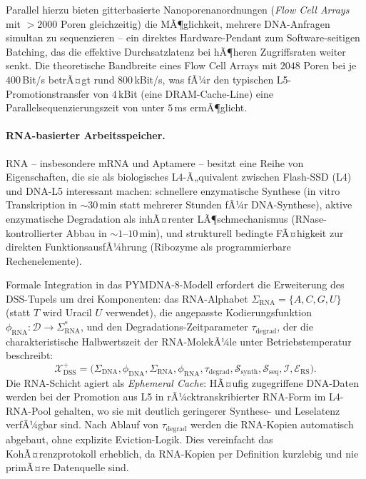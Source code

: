 ﻿\documentclass[a4paper,12pt]{article}
\theoremstyle{definition}
\begin{document}
Parallel hierzu bieten gitterbasierte Nanoporenanordnungen (\emph{Flow Cell Arrays} mit $> 2000$ Poren gleichzeitig) die MÃ¶glichkeit, mehrere DNA-Anfragen simultan zu sequenzieren -- ein direktes Hardware-Pendant zum Software-seitigen Batching, das die effektive Durchsatzlatenz bei hÃ¶heren Zugriffsraten weiter senkt. Die theoretische Bandbreite eines Flow Cell Arrays mit $2048$ Poren bei je $400$\,Bit/s betrÃ¤gt rund $800$\,kBit/s, was fÃ¼r den typischen L5-Promotionstransfer von $4$\,kBit (eine DRAM-Cache-Line) eine Parallelsequenzierungszeit von unter $5$\,ms ermÃ¶glicht.

\paragraph{RNA-basierter Arbeitsspeicher.}
RNA -- insbesondere mRNA und Aptamere -- besitzt eine Reihe von Eigenschaften, die sie als biologisches L4-Ã„quivalent zwischen Flash-SSD (L4) und DNA-L5 interessant machen: schnellere enzymatische Synthese (in vitro Transkription in $\sim 30$\,min statt mehrerer Stunden fÃ¼r DNA-Synthese), aktive enzymatische Degradation als inhÃ¤renter LÃ¶schmechanismus (RNase-kontrollierter Abbau in $\sim 1$--$10$\,min), und strukturell bedingte FÃ¤higkeit zur direkten FunktionsausfÃ¼hrung (Ribozyme als programmierbare Rechenelemente).

Formale Integration in das PYMDNA-8-Modell erfordert die Erweiterung des DSS-Tupels um drei Komponenten: das RNA-Alphabet $\Sigma_{\mathrm{RNA}} = \{A, C, G, U\}$ (statt $T$ wird Uracil $U$ verwendet), die angepasste Kodierungsfunktion $\phi_{\mathrm{RNA}}: \mathcal{D} \to \Sigma_{\mathrm{RNA}}^*$, und den Degradations-Zeitparameter $\tau_{\mathrm{degrad}}$, der die charakteristische Halbwertszeit der RNA-MolekÃ¼le unter Betriebstemperatur beschreibt:
\[
  \mathcal{X}_{\mathrm{DSS}}^{+} = \bigl(\Sigma_{\mathrm{DNA}}, \phi_{\mathrm{DNA}}, \Sigma_{\mathrm{RNA}}, \phi_{\mathrm{RNA}}, \tau_{\mathrm{degrad}}, \mathcal{S}_{\mathrm{synth}}, \mathcal{S}_{\mathrm{seq}}, \mathcal{I}, \mathcal{E}_{\mathrm{RS}}\bigr).
\]
Die RNA-Schicht agiert als \emph{Ephemeral Cache}: HÃ¤ufig zugegriffene DNA-Daten werden bei der Promotion aus L5 in rÃ¼cktranskribierter RNA-Form im L4-RNA-Pool gehalten, wo sie mit deutlich geringerer Synthese- und Leselatenz verfÃ¼gbar sind. Nach Ablauf von $\tau_{\mathrm{degrad}}$ werden die RNA-Kopien automatisch abgebaut, ohne explizite Eviction-Logik. Dies vereinfacht das KohÃ¤renzprotokoll erheblich, da RNA-Kopien per Definition kurzlebig und nie primÃ¤re Datenquelle sind.
\end{document}
